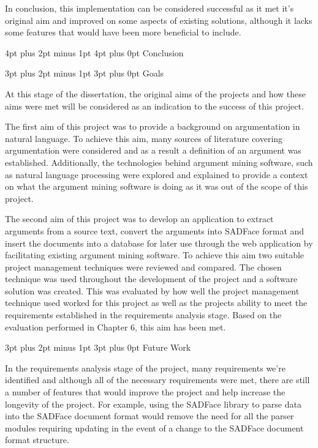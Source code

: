 \documentclass[12pt,a4paper]{article}
\makeatletter
\renewcommand\subsection{\@startsection {subsection}{1}{2mm} %
                               {3pt plus 2pt minus 1pt} %
                               {3pt plus 0pt} %
                               {\normalfont\bfseries}}
\renewcommand\section{\@startsection {section}{1}{0mm} %
                               {4pt plus 2pt minus 1pt} %
                               {4pt plus 0pt} %
                               {\bfseries}}
\makeatother
\begin{document}
In conclusion, this implementation can be considered successful as it met it's original aim and improved on some aspects of existing solutions, although it lacks some features that would have been more beneficial to include.

\newpage
\section{Conclusion}

\subsection{Goals}

At this stage of the dissertation, the original aims of the projects and how these aims were met will be considered as an indication to the success of this project.

The first aim of this project was to provide a background on argumentation in natural language. To achieve this aim, many sources of literature covering argumentation were considered and as a result a definition of an argument was established. Additionally, the technologies behind argument mining software, such as natural language processing were explored and explained to provide a context on what the argument mining software is doing as it was out of the scope of this project.

The second aim of this project was to develop an application to extract arguments from a source text, convert the arguments into SADFace format and insert the documents into a database for later use through the web application by facilitating existing argument mining software. To achieve this aim two suitable project management techniques were reviewed and compared. The chosen technique was used throughout the development of the project and a software solution was created. This was evaluated by how well the project management technique used worked for this project as well as the projects ability to meet the requirements established in the requirements analysis stage. Based on the evaluation performed in Chapter 6, this aim has been met.

\subsection{Future Work}

In the requirements analysis stage of the project, many requirements we're identified and although all of the necessary requirements were met, there are still a number of features that would improve the project and help increase the longevity of the project. For example, using the SADFace library to parse data into the SADFace document format would remove the need for all the parser modules requiring updating in the event of a change to the SADFace document format structure.
\end{document}
